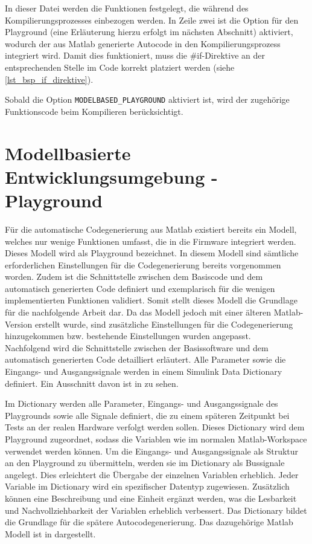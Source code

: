 In dieser Datei werden die Funktionen festgelegt, die während des Kompilierungsprozesses einbezogen werden. In Zeile zwei ist die Option für den Playground (eine Erläuterung hierzu erfolgt im nächsten Abschnitt) aktiviert, wodurch der aus Matlab generierte Autocode in den Kompilierungsprozess integriert wird. Damit dies funktioniert, muss die \#if-Direktive an der entsprechenden Stelle im Code korrekt platziert werden (siehe \autoref{lst_bsp_if_direktive}).

Sobald die Option \lstinline{MODELBASED_PLAYGROUND} aktiviert ist, wird der zugehörige Funktionscode beim Kompilieren berücksichtigt.

\section{Modellbasierte Entwicklungsumgebung - Playground}
\label{sec_modbas_stand_der_technik}
Für die automatische Codegenerierung aus Matlab existiert bereits ein Modell, welches nur wenige Funktionen umfasst, die in die Firmware integriert werden. Dieses Modell wird als Playground bezeichnet. In diesem Modell sind sämtliche erforderlichen Einstellungen für die Codegenerierung bereits vorgenommen worden. Zudem ist die Schnittstelle zwischen dem Basiscode und dem automatisch generierten Code definiert und exemplarisch für die wenigen implementierten Funktionen validiert. Somit stellt dieses Modell die Grundlage für die nachfolgende Arbeit dar. Da das Modell jedoch mit einer älteren Matlab-Version erstellt wurde, sind zusätzliche Einstellungen für die Codegenerierung hinzugekommen bzw. bestehende Einstellungen wurden angepasst.\\
Nachfolgend wird die Schnittstelle zwischen der Basissoftware und dem automatisch generierten Code detailliert erläutert. Alle Parameter sowie die Eingangs- und Ausgangssignale werden in einem Simulink Data Dictionary definiert. Ein Ausschnitt davon ist in  zu sehen.

Im Dictionary werden alle Parameter, Eingangs- und Ausgangssignale des Playgrounds sowie alle Signale definiert, die zu einem späteren Zeitpunkt bei Tests an der realen Hardware verfolgt werden sollen. Dieses Dictionary wird dem Playground zugeordnet, sodass die Variablen wie im normalen Matlab-Workspace verwendet werden können. Um die Eingangs- und Ausgangssignale als Struktur an den Playground zu übermitteln, werden sie im Dictionary als Bussignale angelegt. Dies erleichtert die Übergabe der einzelnen Variablen erheblich. Jeder Variable im Dictionary wird ein spezifischer Datentyp zugewiesen. Zusätzlich können eine Beschreibung und eine Einheit ergänzt werden, was die Lesbarkeit und Nachvollziehbarkeit der Variablen erheblich verbessert. Das Dictionary bildet die Grundlage für die spätere Autocodegenerierung. Das dazugehörige Matlab Modell ist in  dargestellt. 


